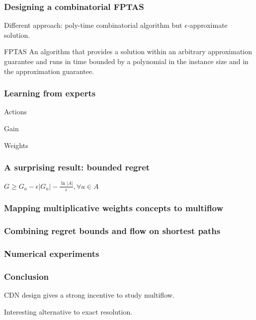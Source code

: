 \documentclass{beamer}
\begin{document}
\begin{frame}
    \frametitle{Designing a combinatorial FPTAS}

    Different approach: poly-time combinatorial algorithm but
    $\epsilon$-approximate solution.

    FPTAS An algorithm that provides a solution within an arbitrary
    approximation guarantee and runs in time bounded by a polynomial in the
    instance size and in the approximation guarantee.

\end{frame}

\begin{frame}
    \frametitle{Learning from experts}

    Actions

    Gain

    Weights

\end{frame}

\begin{frame}
    \frametitle{A surprising result: bounded regret}

    $G \geq G_a - \epsilon |G_a| - \frac{\ln |A|}{\epsilon}, \forall a \in A$
\end{frame}

\begin{frame}
    \frametitle{Mapping multiplicative weights concepts to multiflow}
\end{frame}

\begin{frame}
    \frametitle{Combining regret bounds and flow on shortest paths}

\end{frame}

\begin{frame}
    \frametitle{Numerical experiments}

\end{frame}

\begin{frame}
    \frametitle{Conclusion}

    CDN design gives a strong incentive to study multiflow.

    Interesting alternative to exact resolution.


\end{frame}
\end{document}
